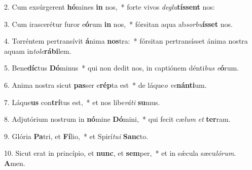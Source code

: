 2. Cum exsúrgerent \textbf{hó}mines \textbf{in} nos,~*  forte vivos \textit{de}\textit{glu}\textbf{tís}\textbf{sent} nos:\

3. Cum irascerétur furor e\textbf{ó}rum \textbf{in} nos,~*  fórsitan aqua ab\textit{sor}\textit{bu}\textbf{ís}\textbf{set} nos.\

4. Torréntem pertransívit \textbf{á}nima \textbf{nos}tra:~*  fórsitan pertransísset ánima nostra aquam in\textit{to}\textit{le}\textbf{rá}\textbf{bi}lem.\

5. Bene\textbf{díc}tus \textbf{Dó}minus~*  qui non dedit nos, in captiónem dénti\textit{bus} \textit{e}\textbf{ó}rum.\

6. Anima nostra sicut \textbf{pas}ser e\textbf{rép}ta est~*  de láque\textit{o} \textit{ve}\textbf{nán}\textbf{ti}um.\

7. Láque\textbf{us} con\textbf{trí}tus est,~*  et nos libe\textit{rá}\textit{ti} \textbf{su}mus.\

8. Adjutórium nostrum in \textbf{nó}mine \textbf{Dó}mini,~*  qui fecit cæ\textit{lum} \textit{et} \textbf{ter}ram.\

9. Glória \textbf{Pa}tri, et \textbf{Fí}lio,~*  et Spirí\textit{tu}\textit{i} \textbf{Sanc}to.\

10. Sicut erat in princípio, et \textbf{nunc}, et \textbf{sem}per,~*  et in sǽcula sæcu\textit{ló}\textit{rum}. \textbf{A}men.\

